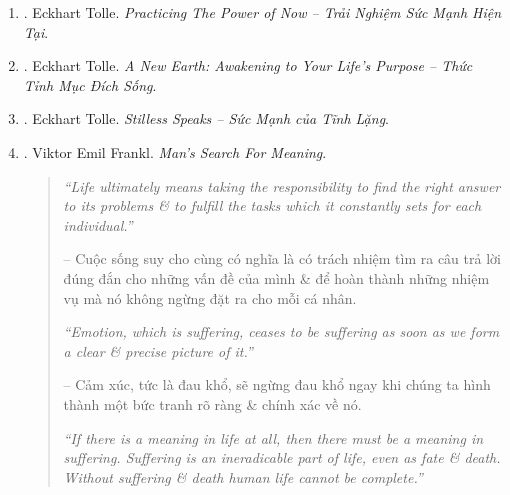 \documentclass[12pt]{article}
\begin{document}
\begin{enumerate}
\begin{quotation}
		-- Sự khởi đầu của tự do là việc nhận ra rằng bạn không phải là thực thể sở hữu - người suy nghĩ. Biết được điều này cho phép bạn quan sát thực thể. Khoảnh khắc bạn bắt đầu quan sát người suy nghĩ, mức độ ý thức cao hơn sẽ được kích hoạt.
	\end{quotation}
	Với bản dịch tiếng Việt:
	\item \cite{Tolle_practice_now_VN}. {\sc Eckhart Tolle}. {\it Practicing The Power of Now -- Trải Nghiệm Sức Mạnh Hiện Tại}.
	\item \cite{Tolle_earth_VN}. {\sc Eckhart Tolle}. {\it A New Earth: Awakening to Your Life's Purpose -- Thức Tỉnh Mục Đích Sống}.
	\item \cite{Tolle_stillness_VN}. {\sc Eckhart Tolle}. {\it Stilless Speaks -- Sức Mạnh của Tĩnh Lặng}.
	\item \cite{Frankl_meaning,Frankl_meaning_revised}. {\sc Viktor Emil Frankl}. {\it Man's Search For Meaning}.
	\begin{quotation}
		{\it``Life ultimately means taking the responsibility to find the right answer to its problems \& to fulfill the tasks which it constantly sets for each individual.''}
		
		-- Cuộc sống suy cho cùng có nghĩa là có trách nhiệm tìm ra câu trả lời đúng đắn cho những vấn đề của mình \& để hoàn thành những nhiệm vụ mà nó không ngừng đặt ra cho mỗi cá nhân.
		
		{\it``Emotion, which is suffering, ceases to be suffering as soon as we form a clear \& precise picture of it.''}
		
		-- Cảm xúc, tức là đau khổ, sẽ ngừng đau khổ ngay khi chúng ta hình thành một bức tranh rõ ràng \& chính xác về nó.
		
		{\it``If there is a meaning in life at all, then there must be a meaning in suffering. Suffering is an ineradicable part of life, even as fate \& death. Without suffering \& death human life cannot be complete.''}
		

\end{quotation}
\end{enumerate}
\end{document}
